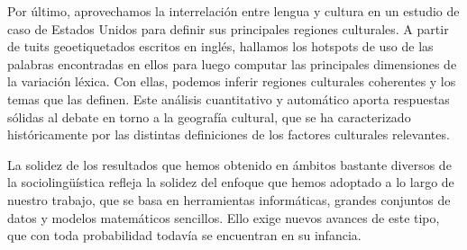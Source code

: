 \documentclass[../thesis.tex]{subfiles}
\begin{document}
\begin{es}
Por último, aprovechamos la interrelación entre lengua y cultura en un estudio de caso
de Estados Unidos para definir sus principales regiones culturales. A partir de tuits
geoetiquetados escritos en inglés, hallamos los hotspots de uso de las palabras
encontradas en ellos para luego computar las principales dimensiones de la variación
léxica. Con ellas, podemos inferir regiones culturales coherentes y los temas que las
definen. Este análisis cuantitativo y automático aporta respuestas sólidas al debate en
torno a la geografía cultural, que se ha caracterizado históricamente por las distintas
definiciones de los factores culturales relevantes.

La solidez de los resultados que hemos obtenido en ámbitos bastante diversos de la
sociolingüística refleja la solidez del enfoque que hemos adoptado a lo largo de nuestro
trabajo, que se basa en herramientas informáticas, grandes conjuntos de datos y modelos
matemáticos sencillos. Ello exige nuevos avances de este tipo, que con toda probabilidad
todavía se encuentran en su infancia.
\end{es}



\clearpage
\end{document}
